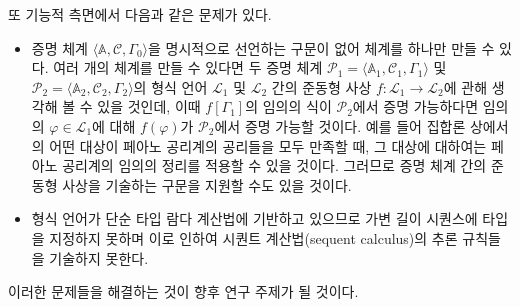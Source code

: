 \documentclass[10pt,twocolumn]{article}
\theoremstyle{definition}
\begin{document}
또 기능적 측면에서 다음과 같은 문제가 있다.

\begin{itemize}
	\item 증명 체계 $\langle\mathbb A, \mathcal C, \Gamma_0\rangle$을 명시적으로 선언하는 구문이 없어 체계를 하나만 만들 수 있다. 여러 개의 체계를 만들 수 있다면 두 증명 체계 $\mathcal P_1 = \langle\mathbb A_1, \mathcal C_1, \Gamma_1\rangle$ 및 $\mathcal P_2 = \langle\mathbb A_2, \mathcal C_2, \Gamma_2\rangle$의 형식 언어 $\mathcal L_1$ 및 $\mathcal L_2$ 간의 준동형 사상 $f: \mathcal L_1\to\mathcal L_2$에 관해 생각해 볼 수 있을 것인데, 이때 $f[\Gamma_1]$의 임의의 식이 $\mathcal P_2$에서 증명 가능하다면 임의의 $\varphi\in\mathcal L_1$에 대해 $f(\varphi)$가 $\mathcal P_2$에서 증명 가능할 것이다. 예를 들어 집합론 상에서의 어떤 대상이 페아노 공리계의 공리들을 모두 만족할 때, 그 대상에 대하여는 페아노 공리계의 임의의 정리를 적용할 수 있을 것이다. 그러므로 증명 체계 간의 준동형 사상을 기술하는 구문을 지원할 수도 있을 것이다.
	\item 형식 언어가 단순 타입 람다 계산법에 기반하고 있으므로 가변 길이 시퀀스에 타입을 지정하지 못하며 이로 인하여 시퀀트 계산법(sequent calculus)의 추론 규칙들을 기술하지 못한다.
\end{itemize}

이러한 문제들을 해결하는 것이 향후 연구 주제가 될 것이다.


\end{document}
